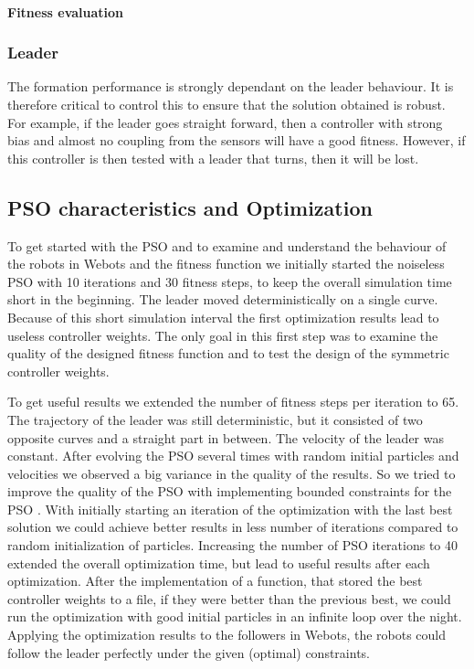 \documentclass[a4, 10 pt, conference]{ieeeconf}  %
\begin{document}
\paragraph{Fitness evaluation}

\subsubsection{Leader}
The formation performance is strongly dependant on the leader behaviour. It is therefore critical to control this to ensure that the solution obtained is robust. For example, if the leader goes straight forward, then a controller with strong bias and almost no coupling from the sensors will have a good fitness. However, if this controller is then tested with a leader that turns, then it will be lost.

\subsection{PSO characteristics and Optimization}

To get started with the PSO and to examine and understand the behaviour of the robots in Webots and the fitness function we initially started the  noiseless PSO with 10 iterations and 30 fitness steps, to keep the overall simulation time short in the beginning. The leader moved deterministically on a single curve.  Because of this short simulation interval the first optimization results lead to useless controller weights. The only goal in this first step was to examine the quality of the designed fitness function and to test the design of the symmetric controller weights.

To get useful results we extended the number of fitness steps per iteration to 65. The trajectory of the leader was still deterministic, but it consisted of two opposite curves and a straight part in between. The velocity of the leader was constant. After evolving the PSO several times with random initial particles and velocities we observed a big variance in the quality of the results. So we tried to improve the quality of the PSO with implementing bounded constraints for the PSO \cite{c1}. With initially starting an iteration of the optimization with the last best solution we could achieve better results in less number of iterations compared to random initialization of particles. Increasing the number of PSO iterations to 40 extended the overall optimization time, but lead to useful results after each optimization. After the implementation of a function, that stored the best controller weights to a file, if they were better than the previous best, we could run the optimization with good initial particles in an infinite loop over the night. Applying the optimization results to the followers in Webots, the robots could follow the leader perfectly under the given (optimal) constraints.
\end{document}
